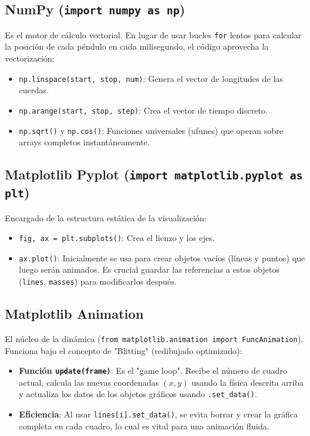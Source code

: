 \documentclass[a4paper,11pt]{article}
\begin{document}
	\subsection{NumPy (\texttt{import numpy as np})}
	Es el motor de cálculo vectorial. En lugar de usar bucles \texttt{for} lentos para calcular la posición de cada péndulo en cada milisegundo, el código aprovecha la vectorización:
	\begin{itemize}
		\item \texttt{np.linspace(start, stop, num)}: Genera el vector de longitudes de las cuerdas.
		\item \texttt{np.arange(start, stop, step)}: Crea el vector de tiempo discreto.
		\item \texttt{np.sqrt()} y \texttt{np.cos()}: Funciones universales (ufuncs) que operan sobre arrays completos instantáneamente.
	\end{itemize}
	
	\subsection{Matplotlib Pyplot (\texttt{import matplotlib.pyplot as plt})}
	Encargado de la estructura estática de la visualización:
	\begin{itemize}
		\item \texttt{fig, ax = plt.subplots()}: Crea el lienzo y los ejes.
		\item \texttt{ax.plot()}: Inicialmente se usa para crear objetos vacíos (líneas y puntos) que luego serán animados. Es crucial guardar las referencias a estos objetos (\texttt{lines}, \texttt{masses}) para modificarlos después.
	\end{itemize}
	
	\subsection{Matplotlib Animation}
	El núcleo de la dinámica (\texttt{from matplotlib.animation import FuncAnimation}). Funciona bajo el concepto de "Blitting" (redibujado optimizado):
	\begin{itemize}
		\item \textbf{Función \texttt{update(frame)}}: Es el "game loop". Recibe el número de cuadro actual, calcula las nuevas coordenadas $(x, y)$ usando la física descrita arriba y actualiza los datos de los objetos gráficos usando \texttt{.set\_data()}.
		\item \textbf{Eficiencia}: Al usar \texttt{lines[i].set\_data()}, se evita borrar y crear la gráfica completa en cada cuadro, lo cual es vital para una animación fluida.
	\end{itemize}
	
\end{document}
